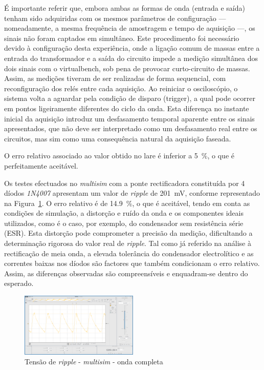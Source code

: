 É importante referir que, embora ambas as formas de onda (entrada e saída) tenham sido adquiridas com os mesmos parâmetros de configuração — nomeadamente, a mesma frequência de amostragem e tempo de aquisição —, os sinais não foram captados em simultâneo. Este procedimento foi necessário devido à configuração desta experiência, onde a ligação comum de massas entre a entrada do transformador e a saída do circuito impede a medição simultânea dos dois sinais com o \acrshort{virtualbench}, sob pena de provocar curto-circuito de massas. Assim, as medições tiveram de ser realizadas de forma sequencial, com reconfiguração dos relés entre cada aquisição. Ao reiniciar o osciloscópio, o sistema volta a aguardar pela condição de disparo (trigger), a qual pode ocorrer em pontos ligeiramente diferentes do ciclo da onda. Esta diferença no instante inicial da aquisição introduz um desfasamento temporal aparente entre os sinais apresentados, que não deve ser interpretado como um desfasamento real entre os circuitos, mas sim como uma consequência natural da aquisição faseada.

O erro relativo associado ao valor obtido no \acrshort{lare} é inferior a \SI{5}{\percent}, o que é perfeitamente aceitável.

Os testes efectuados no \textit{multisim} com a ponte rectificadora constituída por 4 díodos \textit{1N4007} apresentam um valor de \textit{ripple} de \SI{201}{\milli\volt}, conforme representado na Figura~\ref{fig:ripplemultisim}. O erro relativo é de \SI{14.9}{\percent}, o que é aceitável, tendo em conta as condições de simulação, a distorção e ruído da onda e os componentes ideais utilizados, como é o caso, por exemplo, do condensador sem resistência série (ESR). Esta distorção pode comprometer a precisão da medição, dificultando a determinação rigorosa do valor real de \textit{ripple}. Tal como já referido na análise à rectificação de meia onda, a elevada tolerância do condensador electrolítico e as correntes baixas nos díodos são factores que também condicionam o erro relativo. Assim, as diferenças observadas são compreensíveis e enquadram-se dentro do esperado.

\begin{figure}[hbtp]
	\centering
	\includegraphics[width=0.5\textwidth]{figures/OC_RIPPLE_VB_1N4007.png}
	\caption{Tensão de \textit{ripple} - \textit{multisim} - onda completa}
	\label{fig:ripplemultisim}
\end{figure}

